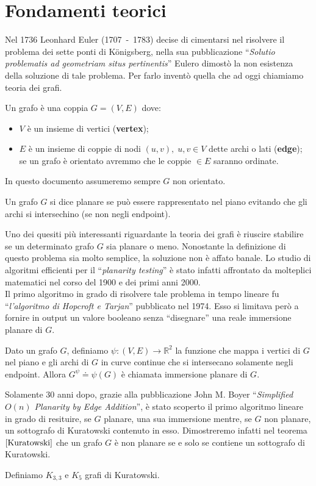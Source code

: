 \chapter{Fondamenti teorici}

Nel 1736 Leonhard Euler (1707~-~1783) decise di cimentarsi nel risolvere il problema dei sette ponti di Königsberg, nella sua pubblicazione “\textit{Solutio problematis ad geometriam situs pertinentis}\cite{ponti}” Eulero dimostò la non esistenza della soluzione di tale problema. Per farlo inventò quella che ad oggi chiamiamo teoria dei grafi.
\begin{definizione}[Grafo]
    Un grafo è una coppia \(G=(V,E)\) dove:
    \begin{itemize}
        \item \(V\) è un insieme di vertici (\textbf{vertex});
        \item \(E\) è un insieme di coppie di nodi \((u,v),\;u,v\in V\) dette archi o lati (\textbf{edge}); se un grafo è orientato avremmo che le coppie \(<u,v>\in E\) saranno ordinate.
    \end{itemize}
\end{definizione}
\noindent In questo documento assumeremo sempre \(G\) non orientato. 
\begin{definizione}\label{grafo-planare}
    Un grafo \(G\) si dice planare se può essere rappresentato nel piano evitando che gli archi si intersechino (se non negli endpoint).
\end{definizione}
Uno dei quesiti più interessanti riguardante la teoria dei grafi è riuscire stabilire se un determinato grafo \(G\) sia planare o meno. Nonostante la definizione di questo problema sia molto semplice, la soluzione non è affato banale. Lo studio di algoritmi efficienti per il “\textit{planarity testing}”  è stato infatti affrontato da molteplici matematici nel corso del 1900 e dei primi anni 2000.\\
Il primo algoritmo in grado di risolvere tale problema in tempo lineare fu “\textit{l'algoritmo di Hopcroft e Tarjan}\cite{Hopcroft}” pubblicato nel 1974. Esso si limitava però a fornire in output un valore booleano senza “disegnare” una reale immersione planare di \(G\).
\begin{definizione}
    Dato un grafo \(G\), definiamo \(\psi : (V,E) \to \mathbb{R}^2\) la funzione che mappa i vertici di \(G\) nel piano e gli archi di \(G\) in curve continue che si intersecano solamente negli endpoint. Allora \(G^\psi \doteq \psi(G)\) è chiamata immersione planare di \(G\).
\end{definizione}
Solamente 30 anni dopo, grazie alla pubblicazione John M. Boyer “\textit{Simplified \(O(n)\) Planarity by Edge Addition}\cite{main_article}”, è stato scoperto il primo algoritmo lineare in grado di resituire, se \(G\) planare, una sua immersione mentre, se \(G\) non planare, un sottografo di Kuratowski contenuto in esso. Dimostreremo infatti nel teorema \(\ref{Kuratowski}\) che un grafo \(G\) è non planare se e solo se contiene un sottografo di Kuratowski.
\begin{definizione}\label{kuratowskisottografo}
    Definiamo \(K_{3,3}\) e \(K_5\) grafi di Kuratowski.
\end{definizione}
